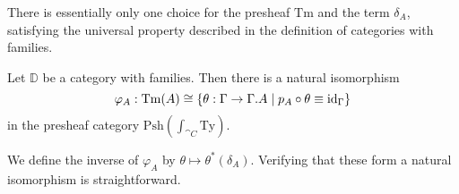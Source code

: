 There is essentially only one choice for the presheaf $\mathrm{Tm}$ and the term $\delta_A$, satisfying the universal property described in the definition of categories with families.

\begin{defn}\label{lem:cwf_to_dsys}
Let $\mathbb{D}$ be a category with families. Then there is a natural isomorphism
\begin{equation*}
\varphi_A:\mathrm{Tm}(A)\cong\{\theta:\Gamma\to\ctxext{\Gamma}{A}\mid p_A\circ\theta\jdeq\catid{\Gamma}\}
\end{equation*}
in the presheaf category $\mathrm{Psh}(\int_{\cat{C}}\mathrm{Ty})$. 
\begin{comment}
The
natural isomorphism $\varphi$ is such that the term $\delta_A\in\mathrm{Tm}((p_A)^\ast(A))$
corresponds to the unique arrow $\tilde{q}_A$ which fits in the diagram
\begin{equation*}
\begin{tikzcd}
\ctxext{\Gamma}{A} \arrow[ddr,bend right=15,equals] \arrow[drr,bend left=15,equals] \arrow[dr,"{\tilde \delta_A}"] \\
& \ctxext{{\Gamma}{A}}{(p_A)^\ast(A)} \arrow[d,fib] & \ctxext{\Gamma}{A} \arrow[d,fib] \\
& \ctxext{\Gamma}{A} \arrow[r,"{p_A}"] & \Gamma
\end{tikzcd}
\end{equation*}
\end{comment}
\end{defn}

\begin{constr}
We define the inverse of $\varphi_A$ by $\theta\mapsto\theta^\ast(\delta_A)$. Verifying
that these form a natural isomorphism is straightforward.
\end{constr}

